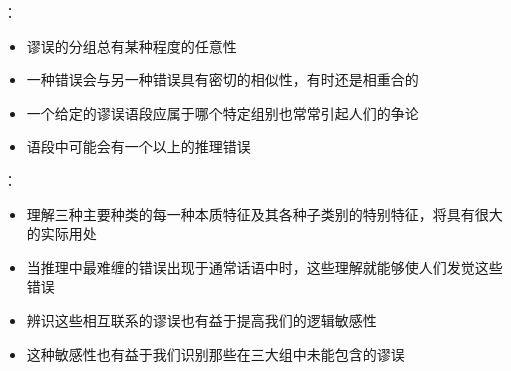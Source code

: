 \begin{theorembox}[title=分类的局限性与价值]
：
\begin{itemize}
  \item 谬误的分组总有某种程度的任意性
  \item 一种错误会与另一种错误具有密切的相似性，有时还是相重合的
  \item 一个给定的谬误语段应属于哪个特定组别也常常引起人们的争论
  \item 语段中可能会有一个以上的推理错误
\end{itemize}

：
\begin{itemize}
  \item 理解三种主要种类的每一种本质特征及其各种子类别的特别特征，将具有很大的实际用处
  \item 当推理中最难缠的错误出现于通常话语中时，这些理解就能够使人们发觉这些错误
  \item 辨识这些相互联系的谬误也有益于提高我们的逻辑敏感性
  \item 这种敏感性也有益于我们识别那些在三大组中未能包含的谬误
\end{itemize}
\end{theorembox}

